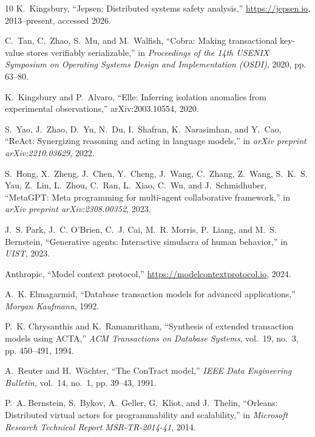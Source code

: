 \documentclass[journal,compsoc,10pt]{IEEEtran}
\theoremstyle{definition}
\theoremstyle{remark}
\begin{document}
\begin{thebibliography}{10}
K.~Kingsbury, ``Jepsen: Distributed systems safety analysis,''
  \url{https://jepsen.io}, 2013--present, accessed 2026.

C.~Tan, C.~Zhao, S.~Mu, and M.~Walfish, ``{Cobra}: Making transactional
  key-value stores verifiably serializable,'' in \emph{Proceedings of the 14th
  {USENIX} Symposium on Operating Systems Design and Implementation ({OSDI})},
  2020, pp. 63--80.

K.~Kingsbury and P.~Alvaro, ``{Elle}: Inferring isolation anomalies from
  experimental observations,'' arXiv:2003.10554, 2020.

S.~Yao, J.~Zhao, D.~Yu, N.~Du, I.~Shafran, K.~Narasimhan, and Y.~Cao,
  ``{ReAct}: Synergizing reasoning and acting in language models,'' in
  \emph{arXiv preprint arXiv:2210.03629}, 2022.

S.~Hong, X.~Zheng, J.~Chen, Y.~Cheng, J.~Wang, C.~Zhang, Z.~Wang, S.~K.~S. Yau,
  Z.~Lin, L.~Zhou, C.~Ran, L.~Xiao, C.~Wu, and J.~Schmidhuber, ``{MetaGPT}:
  Meta programming for multi-agent collaborative framework,'' in \emph{arXiv
  preprint arXiv:2308.00352}, 2023.

J.~S. Park, J.~C. O'Brien, C.~J. Cai, M.~R. Morris, P.~Liang, and M.~S.
  Bernstein, ``Generative agents: Interactive simulacra of human behavior,'' in
  \emph{UIST}, 2023.

{Anthropic}, ``Model context protocol,'' \url{https://modelcontextprotocol.io},
  2024.

A.~K. Elmagarmid, ``Database transaction models for advanced applications,''
  \emph{Morgan Kaufmann}, 1992.

P.~K. Chrysanthis and K.~Ramamritham, ``Synthesis of extended transaction
  models using {ACTA},'' \emph{ACM Transactions on Database Systems}, vol.~19,
  no.~3, pp. 450--491, 1994.

A.~Reuter and H.~W{\"a}chter, ``The {ConTract} model,'' \emph{IEEE Data
  Engineering Bulletin}, vol.~14, no.~1, pp. 39--43, 1991.

P.~A. Bernstein, S.~Bykov, A.~Geller, G.~Kliot, and J.~Thelin, ``{Orleans}:
  Distributed virtual actors for programmability and scalability,'' in
  \emph{Microsoft Research Technical Report MSR-TR-2014-41}, 2014.


\end{thebibliography}
\end{document}
